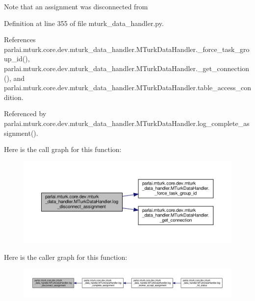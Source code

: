 \begin{DoxyVerb}Note that an assignment was disconnected from\end{DoxyVerb}
 

Definition at line 355 of file mturk\+\_\+data\+\_\+handler.\+py.



References parlai.\+mturk.\+core.\+dev.\+mturk\+\_\+data\+\_\+handler.\+M\+Turk\+Data\+Handler.\+\_\+force\+\_\+task\+\_\+group\+\_\+id(), parlai.\+mturk.\+core.\+dev.\+mturk\+\_\+data\+\_\+handler.\+M\+Turk\+Data\+Handler.\+\_\+get\+\_\+connection(), and parlai.\+mturk.\+core.\+dev.\+mturk\+\_\+data\+\_\+handler.\+M\+Turk\+Data\+Handler.\+table\+\_\+access\+\_\+condition.



Referenced by parlai.\+mturk.\+core.\+dev.\+mturk\+\_\+data\+\_\+handler.\+M\+Turk\+Data\+Handler.\+log\+\_\+complete\+\_\+assignment().

Here is the call graph for this function\+:
\nopagebreak
\begin{figure}[H]
\begin{center}
\leavevmode
\includegraphics[width=350pt]{classparlai_1_1mturk_1_1core_1_1dev_1_1mturk__data__handler_1_1MTurkDataHandler_a42409b508f2b135f6d02c80f39aee466_cgraph}
\end{center}
\end{figure}
Here is the caller graph for this function\+:
\nopagebreak
\begin{figure}[H]
\begin{center}
\leavevmode
\includegraphics[width=350pt]{classparlai_1_1mturk_1_1core_1_1dev_1_1mturk__data__handler_1_1MTurkDataHandler_a42409b508f2b135f6d02c80f39aee466_icgraph}
\end{center}
\end{figure}
\mbox{\label{classparlai_1_1mturk_1_1core_1_1dev_1_1mturk__data__handler_1_1MTurkDataHandler_ab175fd5970bfd7b24751ad99e7b99111}} 
